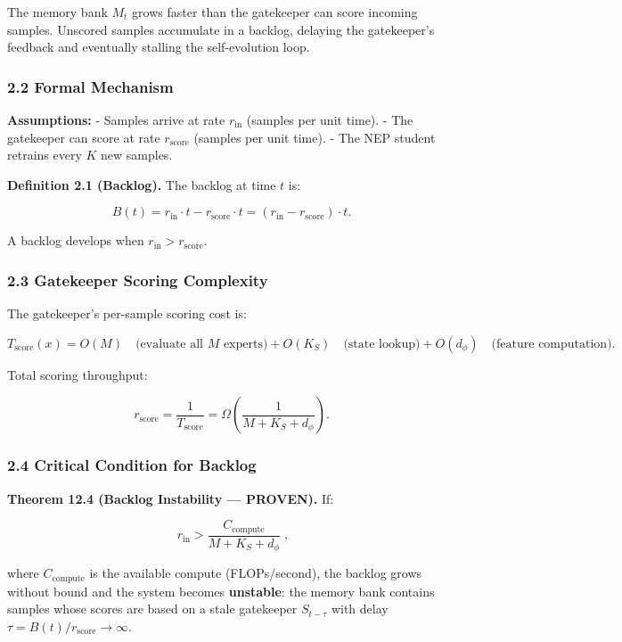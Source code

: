 \documentclass[
  12pt,
]{article}
\begin{document}
The memory bank \(M_t\) grows faster than the gatekeeper can score
incoming samples. Unscored samples accumulate in a backlog, delaying the
gatekeeper's feedback and eventually stalling the self-evolution loop.

\subsubsection{2.2 Formal Mechanism}\label{formal-mechanism-1}

\textbf{Assumptions:} - Samples arrive at rate \(r_{\text{in}}\)
(samples per unit time). - The gatekeeper can score at rate
\(r_{\text{score}}\) (samples per unit time). - The NEP student retrains
every \(K\) new samples.

\textbf{Definition 2.1 (Backlog).} The backlog at time \(t\) is:

\[B(t) = r_{\text{in}} \cdot t - r_{\text{score}} \cdot t = (r_{\text{in}} - r_{\text{score}}) \cdot t.\]

A backlog develops when \(r_{\text{in}} > r_{\text{score}}\).

\subsubsection{2.3 Gatekeeper Scoring
Complexity}\label{gatekeeper-scoring-complexity}

The gatekeeper's per-sample scoring cost is:

\[T_{\text{score}}(x) = O(M) \quad \text{(evaluate all } M \text{ experts)} + O(K_S) \quad \text{(state lookup)} + O(d_\phi) \quad \text{(feature computation)}.\]

Total scoring throughput:

\[r_{\text{score}} = \frac{1}{T_{\text{score}}} = \Omega\!\left(\frac{1}{M + K_S + d_\phi}\right).\]

\subsubsection{2.4 Critical Condition for
Backlog}\label{critical-condition-for-backlog}

\textbf{Theorem 12.4 (Backlog Instability --- PROVEN).} If:

\[\boxed{\;r_{\text{in}} > \frac{C_{\text{compute}}}{M + K_S + d_\phi}\;},\]

where \(C_{\text{compute}}\) is the available compute (FLOPs/second),
the backlog grows without bound and the system becomes
\textbf{unstable}: the memory bank contains samples whose scores are
based on a stale gatekeeper \(S_{t - \tau}\) with delay
\(\tau = B(t) / r_{\text{score}} \to \infty\).
\end{document}
